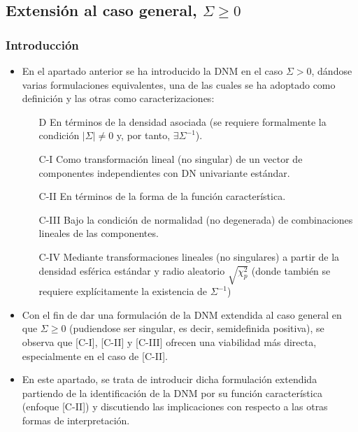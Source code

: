 \documentclass[11pt,a4paper]{article}
\begin{document}
\subsection{Extensión al caso general, \texorpdfstring{$\Sigma \geq 0$})}

\subsubsection{Introducción}
\begin{itemize}
\item En el apartado anterior se ha introducido la DNM en el caso $\Sigma > 0$, dándose varias formulaciones equivalentes, una de las cuales se ha adoptado como definición y las otras como caracterizaciones:
\begin{itemize}
\item[D] En términos de la densidad asociada (se requiere formalmente la condición $|\Sigma| \neq 0$ y, por tanto, $\exists \Sigma^{-1}$).

\item[C-I] Como transformación lineal (no singular) de un vector de componentes independientes con DN univariante estándar.

\item[C-II] En términos de la forma de la función característica.

\item[C-III] Bajo la condición de normalidad (no degenerada) de combinaciones lineales de las componentes.

\item[C-IV] Mediante transformaciones lineales (no singulares) a partir de la densidad esférica estándar y radio aleatorio $\sqrt{\chi_{p}^{2}}$ (donde también se requiere explícitamente la existencia de $\Sigma^{-1}$)
\end{itemize}

\item Con el fin de dar una formulación de la DNM extendida al caso general en que $\Sigma \geq 0$ (pudiendose ser singular, es decir, semidefinida positiva), se observa que [C-I], [C-II] y [C-III] ofrecen una viabilidad más directa, especialmente en el caso de [C-II].

\item En este apartado, se trata de introducir dicha formulación extendida partiendo de la identificación de la DNM por su función característica (enfoque [C-II]) y discutiendo las implicaciones con respecto a las otras formas de interpretación.
\end{itemize}
\end{document}
